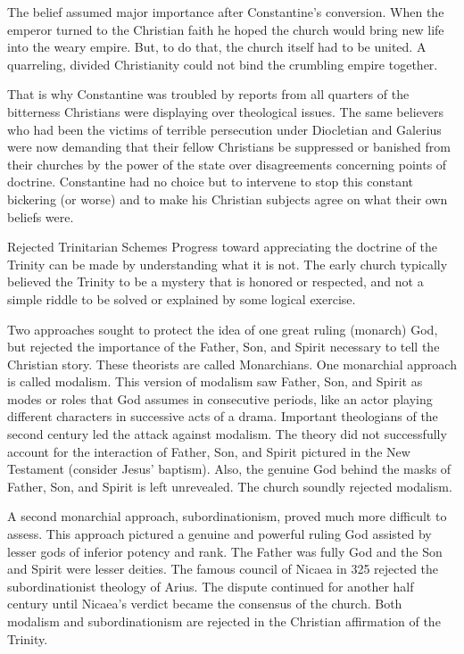 The belief assumed major importance after Constantine’s conversion. When the emperor turned to the
Christian faith he hoped the church would bring new life into the weary empire. But, to do that, the
church itself had to be united. A quarreling, divided Christianity could not bind the crumbling
empire together.

That is why Constantine was troubled by reports from all quarters of the bitterness Christians were
displaying over theological issues. The same believers who had been the victims of terrible
persecution under Diocletian and Galerius were now demanding that their fellow Christians be
suppressed or banished from their churches by the power of the state over disagreements concerning
points of doctrine. Constantine had no choice but to intervene to stop this constant bickering (or
worse) and to make his Christian subjects agree on what their own beliefs were.

\begin{sidebar}{Rejected Trinitarian Schemes}
Progress toward appreciating the doctrine of the Trinity can be made by understanding what it is
not. The early church typically believed the Trinity to be a mystery that is honored or respected,
and not a simple riddle to be solved or explained by some logical exercise.

Two approaches sought to protect the idea of one great ruling (monarch) God, but rejected the
importance of the Father, Son, and Spirit necessary to tell the Christian story. These theorists are
called Monarchians. One monarchial approach is called modalism. This version of modalism saw Father,
Son, and Spirit as modes or roles that God assumes in consecutive periods, like an actor playing
different characters in successive acts of a drama. Important theologians of the second century led
the attack against modalism. The theory did not successfully account for the interaction of Father,
Son, and Spirit pictured in the New Testament (consider Jesus’ baptism). Also, the genuine God
behind the masks of Father, Son, and Spirit is left unrevealed. The church soundly rejected
modalism.

A second monarchial approach, subordinationism, proved much more difficult to assess. This approach
pictured a genuine and powerful ruling God assisted by lesser gods of inferior potency and rank. The
Father was fully God and the Son and Spirit were lesser deities. The famous council of Nicaea in 325
rejected the subordinationist theology of Arius. The dispute continued for another half century
until Nicaea’s verdict became the consensus of the church. Both modalism and subordinationism are
rejected in the Christian affirmation of the Trinity.
\end{sidebar}

